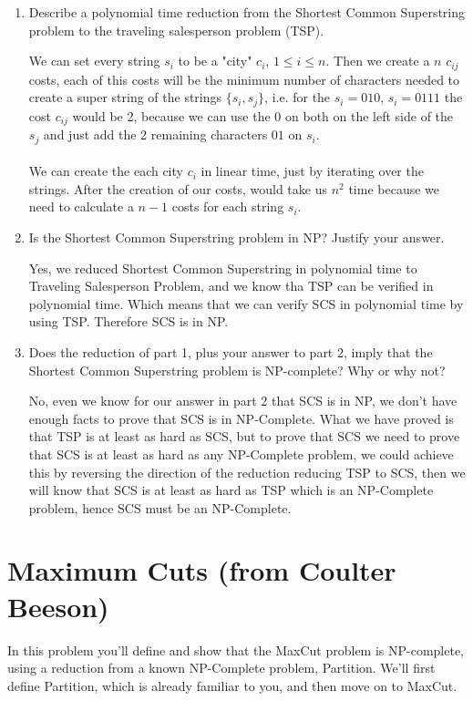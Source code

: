 \documentclass[11pt]{article}
\def\question#1{\red{#1}}
\def\soln#1{\par\blu{#1}} %
\def\blu#1{{\color{blu}#1}}
\def\red#1{{\color{red}#1}}
\begin{document}
\begin{enumerate}
\item \question{Describe a polynomial time reduction from the Shortest Common
Superstring problem to the traveling salesperson problem (TSP).}
\soln{
   We can set every string $s_i$ to be a "city" $c_i$, $1 \le i \le n$.
   Then we create a $n$ $c_{ij}$ costs, each of this costs will be 
   the minimum number of characters needed to create a super string 
   of the strings $\{s_i, s_j\}$, i.e. for the $s_i = 010$, $s_i = 0111$ 
   the cost $c_{ij}$ would be 2, because we can use the 0 on both on the 
   left side of the $s_j$ and just add the 2 remaining characters $01$ on 
   $s_i$. \\ \\
   We can create the each city $c_i$ in linear time, just by iterating 
   over the strings. After the creation of our costs, would take us $n^2$
   time because we need to calculate a $n-1$ costs for each string $s_i$.
}

\item \question{Is the Shortest Common Superstring problem in NP? Justify your answer.}
\soln{
   Yes, we reduced Shortest Common Superstring in polynomial time to 
   Traveling Salesperson Problem, and we know tha TSP can be verified 
   in polynomial time. Which means that we can verify SCS in polynomial time 
   by using TSP. Therefore SCS is in NP.
}

\item \question{Does the reduction of part 1, plus your answer to part 2, imply
that the Shortest Common Superstring problem is NP-complete?  Why
or why not?}
\soln{
   No, even we know for our answer in part 2 that SCS is in NP, we don't 
   have enough facts to prove that SCS is in NP-Complete. What we have 
   proved is that TSP is at least as hard as SCS, but to prove that 
   SCS we need to prove that SCS is at least as hard as any NP-Complete 
   problem, we could achieve this by reversing the direction of the reduction 
   reducing TSP to SCS, then we will know that SCS is at least as hard as TSP 
   which is an NP-Complete problem, hence SCS must be an NP-Complete.
}
\end{enumerate}

\section{Maximum Cuts (from Coulter Beeson)}
\label{sec-4}
In this problem you'll define and show that the MaxCut problem is
NP-complete, using a reduction from a known NP-Complete problem,
Partition.  We'll first define Partition, which is already familiar to you, 
and then move on to MaxCut.
\end{document}
